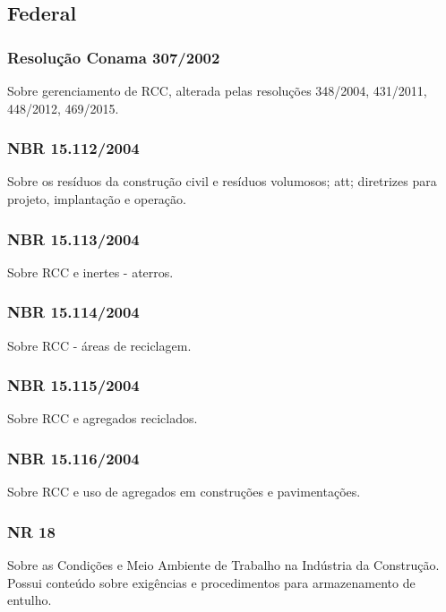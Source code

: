 \subsection{Federal}
\begin{subapend}
	\begin{subsubapend}
		\item \subsubsection{Resolução Conama 307/2002}
		Sobre gerenciamento de RCC, alterada pelas resoluções 348/2004, 431/2011, 448/2012, 469/2015.
		\subsubsection{NBR 15.112/2004}
		Sobre os resíduos da construção civil e resíduos volumosos; \gls{att}; diretrizes para projeto, implantação e operação.
		\subsubsection{NBR 15.113/2004}
		Sobre RCC e inertes - aterros.
		\subsubsection{NBR 15.114/2004}
		Sobre RCC - áreas de reciclagem.
		\subsubsection{NBR 15.115/2004}
		Sobre RCC e agregados reciclados.
		\subsubsection{NBR 15.116/2004}
		Sobre RCC e uso de agregados em construções e pavimentações.
		\subsubsection{NR 18}
		Sobre as Condições e Meio Ambiente de Trabalho na Indústria da Construção. Possui conteúdo sobre exigências e procedimentos para armazenamento de entulho.
	\end{subsubapend}
\end{subapend}


